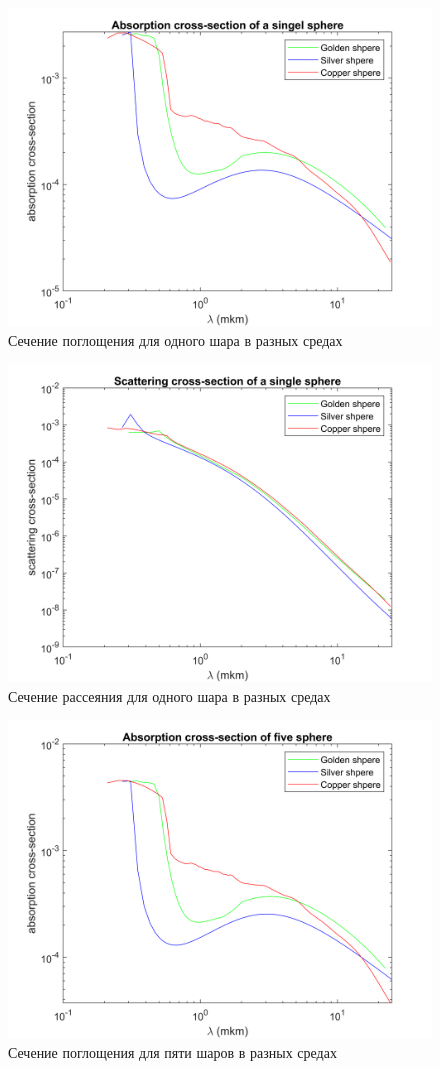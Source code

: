 \begin{figure}[h!]
	\centering
	\includegraphics[width=0.8\linewidth]{absorpForONE}
	\caption{Сечение поглощения для одного шара в разных средах}
	\label{fig:absorpForONE}
\end{figure} 
\begin{figure}[h!]
	\centering
	\includegraphics[width=0.8\linewidth]{scatForONE}
	\caption{Сечение рассеяния для одного шара в разных средах}
	\label{fig:scatForONE}
\end{figure} 
\begin{figure}[h!]
	\centering
	\includegraphics[width=0.8\linewidth]{absorpForFIVE}
	\caption{Сечение поглощения для пяти шаров в разных средах}
	\label{fig:absorpForFIVE}
\end{figure} 
